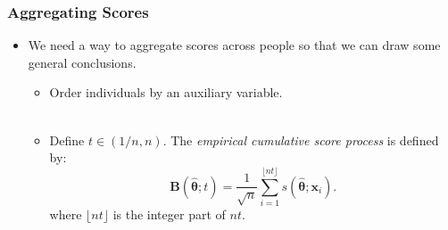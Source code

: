 \documentclass{beamer}
\begin{document}

\begin{frame}[fragile]
  \frametitle{Aggregating Scores}
  \begin{itemize}
    \item We need a way to aggregate scores across people so that we
      can draw some general conclusions.
      \begin{itemize}
        \item Order individuals by an auxiliary variable.\\ \ \\
        \item Define $t \in (1/n, n)$.
          The {\em empirical cumulative score process} is defined by:\\
  \begin{equation*}
    \bm{B}(\hat{\bm{\theta}}; t) = \frac{1}{\sqrt{n}}
    \displaystyle\sum_{i=1}^{\lfloor nt 
      \rfloor} s(\hat{\bm{\theta}} ; \bm{x}_i).
    \end{equation*}
  where $\lfloor nt \rfloor$ is the integer part of $nt$.
      \end{itemize}
  \end{itemize}
\end{frame}

\end{document}
